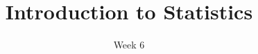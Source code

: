 \title{Introduction to Statistics}
\date{Week 6}





\thispagestyle{plain}
\graphicspath{{lectures/week06/}}




